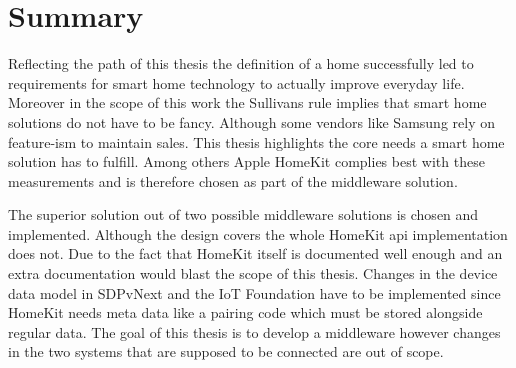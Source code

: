 \clearpage
\section{Summary}%






	Reflecting the path of this thesis the definition of a home successfully led to requirements for smart home technology to actually improve everyday life. Moreover in the scope of this work the Sullivans rule implies that smart home solutions do not have to be fancy. Although some vendors like Samsung rely on feature-ism to maintain sales. This thesis highlights the core needs a smart home solution has to fulfill. Among others Apple HomeKit complies best with these measurements and is therefore chosen as part of the middleware solution.

	The superior solution out of two possible middleware solutions is chosen and implemented. Although the design covers the whole HomeKit api implementation does not. Due to the fact that HomeKit itself is documented well enough and an extra documentation would blast the scope of this thesis. Changes in the device data model in SDPvNext and the IoT Foundation have to be implemented since HomeKit needs meta data like a pairing code which must be stored alongside regular data. The goal of this thesis is to develop a middleware however changes in the two systems that are supposed to be connected are out of scope.\\

